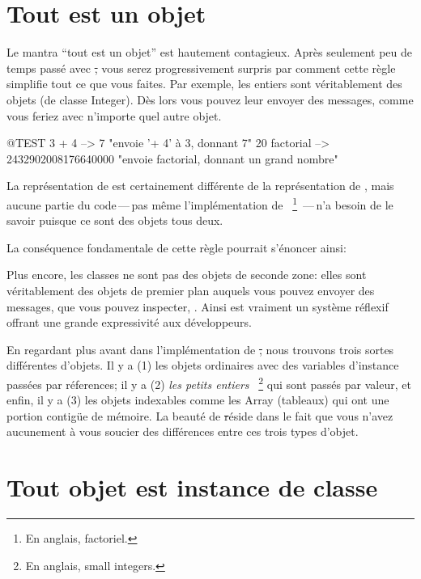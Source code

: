\documentclass[a4paper,10pt,twoside]{book}
\begin{document}
\section{Tout est un objet}


Le mantra ``tout est un objet'' est hautement contagieux.
Apr\`es seulement peu de temps pass\'e avec \st, vous serez progressivement surpris par comment cette r\`egle simplifie tout ce que vous faites.
Par exemple, les entiers sont v\'eritablement des objets (de classe Integer). D\`es lors vous pouvez leur envoyer des messages, comme vous feriez avec n'importe quel autre objet.

\begin{code}{@TEST}
3 + 4            --> 7    "envoie '+ 4' \`a 3, donnant 7"
20 factorial  --> 2432902008176640000   "envoie factorial, donnant un grand nombre"
\end{code}

La repr\'esentation de  est certainement diff\'erente de la repr\'esentation de , mais aucune partie du code\,---\,pas m\^eme l'impl\'ementation de 
~\footnote{En anglais, factoriel.}
\,---\,n'a besoin de le savoir puisque ce sont des objets tous deux.

La cons\'equence fondamentale de cette r\`egle pourrait s'\'enoncer ainsi:

Plus encore, les classes ne sont pas des objets de seconde zone: elles sont v\'eritablement des objets de premier plan auquels vous pouvez envoyer des messages, que vous pouvez inspecter, \etc.
Ainsi \squeak est vraiment un syst\`eme r\'eflexif offrant une grande expressivit\'e
aux développeurs.

En regardant plus avant dans l'impl\'ementation de \st, nous trouvons trois sortes diff\'erentes d'objets. Il y a (1) les objets ordinaires avec des variables d'instance pass\'ees par r\'eferences; il y a (2) \emph{les petits entiers} ~\footnote{En anglais, small integers.} qui sont pass\'es par valeur, et enfin, il y a (3) les objets indexables comme les Array (tableaux) qui ont une portion contig\"ue de m\'emoire. La beaut\'e de \st r\'eside 
dans le fait que vous n'avez aucunement \`a vous soucier des diff\'erences entre ces trois types
d'objet.


\section{Tout objet est instance de classe}
\end{document}
